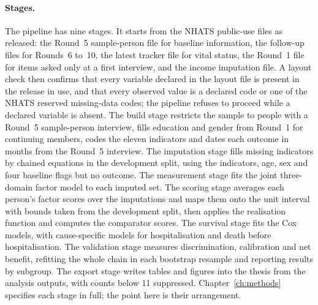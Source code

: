 \paragraph{Stages.} The pipeline has nine stages. It starts from the NHATS
public-use files as released: the Round~5 sample-person file for baseline
information, the follow-up files for Rounds~6 to~10, the latest tracker file
for vital status, the Round~1 file for items asked only at a first interview,
and the income imputation file. A layout check then confirms that every
variable declared in the layout file is present in the release in use, and
that every observed value is a declared code or one of the NHATS reserved
missing-data codes; the pipeline refuses to proceed while a declared variable
is absent. The build stage restricts the sample to people with a Round~5
sample-person interview, fills education and gender from Round~1 for
continuing members, codes the eleven indicators and dates each outcome in
months from the Round~5 interview. The imputation stage fills missing
indicators by chained equations in the development split, using the
indicators, age, sex and four baseline flags but no outcome. The measurement
stage fits the joint three-domain factor model to each imputed set. The
scoring stage averages each person's factor scores over the imputations and
maps them onto the unit interval with bounds taken from the development split,
then applies the realisation function and computes the comparator scores. The
survival stage fits the Cox models, with cause-specific models for
hospitalisation and death before hospitalisation. The validation stage
measures discrimination, calibration and net benefit, refitting the whole
chain in each bootstrap resample and reporting results by subgroup. The export
stage writes tables and figures into the thesis from the analysis outputs,
with counts below 11 suppressed. Chapter~\ref{ch:methods} specifies each stage
in full; the point here is their arrangement.

